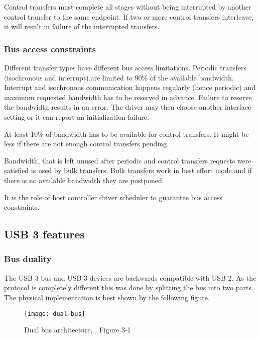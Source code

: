 Control transfers must complete all stages without being interrupted by another
control transfer to the same endpoint. If two or more control transfers
interleave, it will result in failure of the interrupted transfers.

\subsubsection{Bus access constraints}

Different transfer types have different bus access limitations. Periodic
transfers (isochronous and interrupt),are limited to 90\% of the available
bandwidth. Interrupt and isochronous communication happens regularly (hence
periodic) and maximum requested bandwidth has to be reserved in advance.
Failure to reserve the bandwidth results in an error. The driver may then
choose another interface setting or it can report an initialization failure.

At least 10\% of bandwidth has to be available for control transfers. It might
be less if there are not enough control transfers pending.

Bandwidth, that is left unused after periodic and control transfers requests
were satisfied is used by bulk transfers. Bulk transfers work in best effort
mode and if there is no available bandwidth they are postponed.

It is the role of host controller driver scheduler to guarantee bus access
constraints.

\subsection{USB 3 features}

\subsubsection{Bus duality}

The USB 3 bus and USB 3 devices are backwards compatible with USB 2. As the
protocol is completely different this was done by splitting the bus into two
parts. The physical implementation is best shown by the following figure.

\begin{figure}[h]
	\centering
	\texttt{[image: dual-bus]}
	\caption{Dual bus architecture, \cite{usb3}, Figure 3-1}
	\label{fig:dual-bus}
\end{figure}



